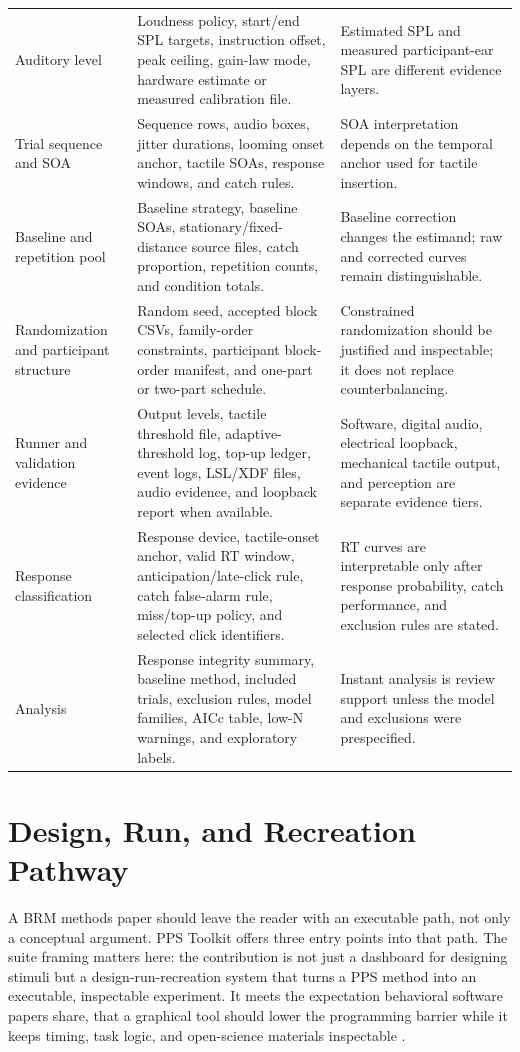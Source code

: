 \documentclass[pdflatex,sn-apa]{sn-jnl}
\newcommand{\toolkit}{PPS Toolkit}
\begin{document}
\begin{table}[t]
\begin{tabularx}{\textwidth}{>{\raggedright\arraybackslash}p{} >{\raggedright\arraybackslash}X >{\raggedright\arraybackslash}p{}}
Auditory level & Loudness policy, start/end SPL targets, instruction offset, peak ceiling, gain-law mode, hardware estimate or measured calibration file. & Estimated SPL and measured participant-ear SPL are different evidence layers. \\
Trial sequence and SOA & Sequence rows, audio boxes, jitter durations, looming onset anchor, tactile SOAs, response windows, and catch rules. & SOA interpretation depends on the temporal anchor used for tactile insertion. \\
Baseline and repetition pool & Baseline strategy, baseline SOAs, stationary/fixed-distance source files, catch proportion, repetition counts, and condition totals. & Baseline correction changes the estimand; raw and corrected curves remain distinguishable. \\
Randomization and participant structure & Random seed, accepted block CSVs, family-order constraints, participant block-order manifest, and one-part or two-part schedule. & Constrained randomization should be justified and inspectable; it does not replace counterbalancing. \\
Runner and validation evidence & Output levels, tactile threshold file, adaptive-threshold log, top-up ledger, event logs, LSL/XDF files, audio evidence, and loopback report when available. & Software, digital audio, electrical loopback, mechanical tactile output, and perception are separate evidence tiers. \\
Response classification & Response device, tactile-onset anchor, valid RT window, anticipation/late-click rule, catch false-alarm rule, miss/top-up policy, and selected click identifiers. & RT curves are interpretable only after response probability, catch performance, and exclusion rules are stated. \\
Analysis & Response integrity summary, baseline method, included trials, exclusion rules, model families, AICc table, low-N warnings, and exploratory labels. & Instant analysis is review support unless the model and exclusions were prespecified. \\
\bottomrule
\end{tabularx}
\end{table}

\section{Design, Run, and Recreation Pathway}

A BRM methods paper should leave the reader with an executable path, not only a conceptual argument. \toolkit{} offers three entry points into that path. The suite framing matters here: the contribution is not just a dashboard for designing stimuli but a design-run-recreation system that turns a PPS method into an executable, inspectable experiment. It meets the expectation behavioral software papers share, that a graphical tool should lower the programming barrier while it keeps timing, task logic, and open-science materials inspectable \citep{AnwylIrvine2018,Peirce2019,Akam2022}.
\end{document}
